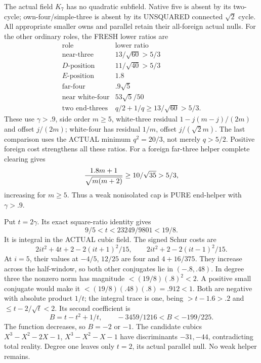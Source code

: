 The actual field \(K_7\) has no quadratic
subfield.  Native five is absent by its
two-cycle; own-four/simple-three is absent
by its UNSQUARED connected \(\sqrt2\) cycle.
All appropriate smaller owns and parallel
retain their all-foreign actual nulls.
For the other ordinary roles, the FRESH
lower ratios are
\[
 \begin{array}{c|c}
 \text{role}&\text{lower ratio}\\ \hline
 \text{near-three}&13/\sqrt{60}>5/3\\
 D\text{-position}&11/\sqrt{40}>5/3\\
 E\text{-position}&1.8\\
 \text{far-four}&.9\sqrt5\\
 \text{near white-four}&53\sqrt5/50\\
 \text{two end-threes}&q/2+1/q\ge13/\sqrt{60}>5/3 .
 \end{array}
\]
These use \(\gamma>.9\), side order
\(m\ge5\), white-three residual
\(1-j(m-j)/(2m)\) and offset \(j/(2m)\);
white-four has residual \(1/m\), offset
\(j/(\sqrt2m)\).
The last comparison uses the ACTUAL minimum
\(q^2=20/3\), not merely \(q>5/2\).
Positive foreign cost strengthens all
these ratios.
For a foreign far-three helper complete
clearing gives
\[
        {1.8m+1\over\sqrt{m(m+2)}}\ge10/\sqrt{35}>5/3 ,
\]
increasing for \(m\ge5\).
Thus a weak nonisolated cap is PURE
end-helper with \(\gamma>.9\).

Put \(t=2\gamma\).
Its exact square-ratio identity gives
\[
                      9/5<t<23249/9801<19/8 .
\]
It is integral in the ACTUAL cubic field.
The signed Schur costs are
\[
 2it^2+4t+2-2(it+1)^2/15,\qquad
 2it^2+2-2(it-1)^2/15 .
\]
At \(i=5\), their values at \(-4/5\),
\(12/25\) are four and \(4+16/375\).
They increase across the half-window,
so both other conjugates lie in
\((-.8,.48)\).
In degree three the nonzero norm has
magnitude \(<(19/8)(.8)^2<2\).
A positive small conjugate would make it
\(<(19/8)(.48)(.8)=.912<1\).
Both are negative with absolute product
\(1/t\); the integral trace is one,
being \(>t-1.6>.2\) and
\(\le t-2/\sqrt t<2\).
Its second coefficient is
\[
 B=t-t^2+1/t,\qquad
                    -3459/1216<B<-199/225 .
\]
The function decreases, so \(B=-2\) or
\(-1\).
The candidate cubics
\(X^3-X^2-2X-1\), \(X^3-X^2-X-1\)
have discriminants \(-31,-44\), contradicting
total reality.
Degree one leaves only \(t=2\), its
actual parallel null.
No weak helper remains.

